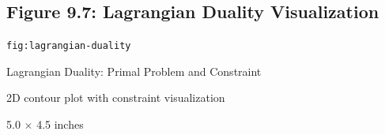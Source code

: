\documentclass[12pt]{article}
\begin{document}
\newpage

\subsection{Figure 9.7: Lagrangian Duality Visualization}

\begin{description}[style=nextline, leftmargin=0pt]
    \item[Figure ID] \texttt{fig:lagrangian-duality}
    \item[Title] Lagrangian Duality: Primal Problem and Constraint
    \item[Type] 2D contour plot with constraint visualization
    \item[Size] 5.0 $\times$ 4.5 inches


\end{description}
\end{document}
